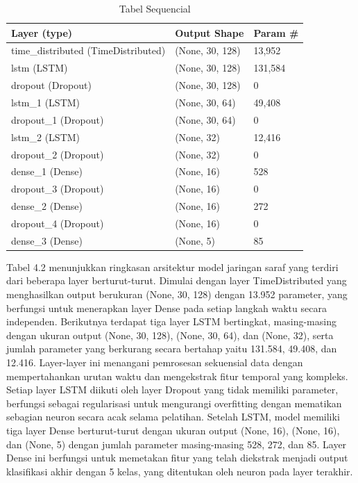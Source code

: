 \begin{table}[htbp]
\centering
\label{tabel Sequencial}
\caption{Tabel Sequencial}
\begin{tabular}{|l|l|l|}
\hline
\textbf{Layer (type)} & \textbf{Output Shape} & \textbf{Param \#} \\ \hline
time\_distributed (TimeDistributed) & (None, 30, 128) & 13,952 \\ \hline
lstm (LSTM) & (None, 30, 128) & 131,584 \\ \hline
dropout (Dropout) & (None, 30, 128) & 0 \\ \hline
lstm\_1 (LSTM) & (None, 30, 64) & 49,408 \\ \hline
dropout\_1 (Dropout) & (None, 30, 64) & 0 \\ \hline
lstm\_2 (LSTM) & (None, 32) & 12,416 \\ \hline
dropout\_2 (Dropout) & (None, 32) & 0 \\ \hline
dense\_1 (Dense) & (None, 16) & 528 \\ \hline
dropout\_3 (Dropout) & (None, 16) & 0 \\ \hline
dense\_2 (Dense) & (None, 16) & 272 \\ \hline
dropout\_4 (Dropout) & (None, 16) & 0 \\ \hline
dense\_3 (Dense) & (None, 5) & 85 \\ \hline
\end{tabular}
\end{table}

Tabel 4.2 menunjukkan ringkasan arsitektur model jaringan saraf yang terdiri dari beberapa layer berturut-turut. 
Dimulai dengan layer TimeDistributed yang menghasilkan output berukuran (None, 30, 128) dengan 13.952 parameter, 
yang berfungsi untuk menerapkan layer Dense pada setiap langkah waktu secara independen. Berikutnya terdapat tiga layer LSTM bertingkat, 
masing-masing dengan ukuran output (None, 30, 128), (None, 30, 64), dan (None, 32), serta jumlah parameter yang berkurang 
secara bertahap yaitu 131.584, 49.408, dan 12.416. Layer-layer ini menangani pemrosesan sekuensial data dengan mempertahankan urutan waktu 
dan mengekstrak fitur temporal yang kompleks. Setiap layer LSTM diikuti oleh layer Dropout yang tidak memiliki parameter, berfungsi sebagai 
regularisasi untuk mengurangi overfitting dengan mematikan sebagian neuron secara acak selama pelatihan. Setelah LSTM, model memiliki tiga 
layer Dense berturut-turut dengan ukuran output (None, 16), (None, 16), dan (None, 5) dengan jumlah parameter masing-masing 528, 272, dan 85. 
Layer Dense ini berfungsi untuk memetakan fitur yang telah diekstrak menjadi output klasifikasi akhir dengan 5 kelas, yang ditentukan oleh 
neuron pada layer terakhir.

